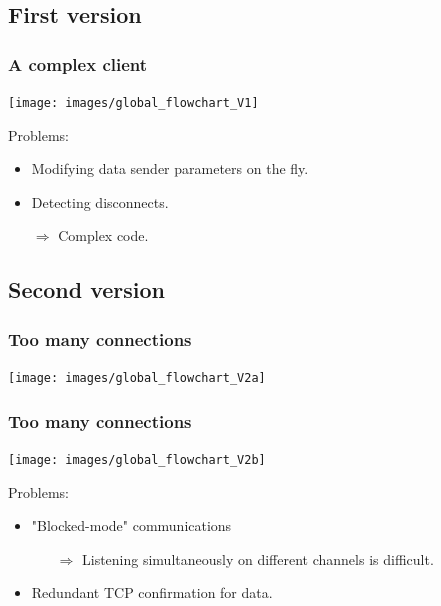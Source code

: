 \documentclass{beamer}
\begin{document}

\begin{frame}
\subsection{First version}
\frametitle{A complex client}
\begin{center}
	\texttt{[image: images/global\_flowchart\_V1]}
\end{center}
\end{frame}

\begin{frame}
Problems:
\begin{itemize}
	\item Modifying data sender parameters on the fly.
	\item Detecting disconnects.
	\item[$\Rightarrow$] Complex code.
\end{itemize}

\end{frame}

\subsection{Second version}
\begin{frame}
\frametitle{Too many connections}
\begin{center}
	\texttt{[image: images/global\_flowchart\_V2a]}
\end{center}
\end{frame}


\begin{frame}
\frametitle{Too many connections}
\begin{center}
	\texttt{[image: images/global\_flowchart\_V2b]}
\end{center}
\end{frame}

\begin{frame}

Problems:
\begin{itemize}
	\item "Blocked-mode" communications
	\begin{itemize}
		\item[$\Rightarrow$] Listening simultaneously on different channels is difficult.
	\end{itemize}
	\item[]
	\item Redundant TCP confirmation for data.
\end{itemize}

\end{frame}
\end{document}
